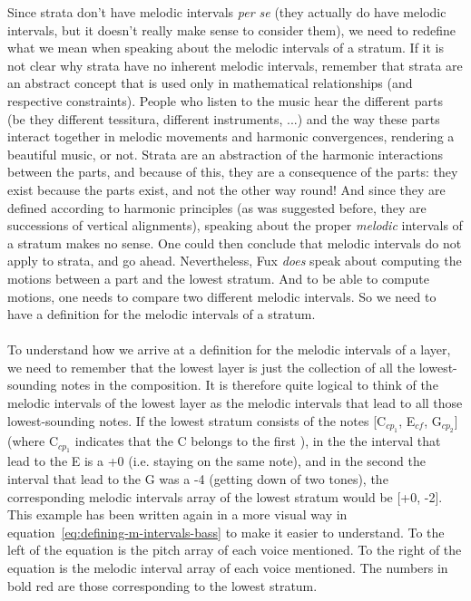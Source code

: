 Since strata don't have melodic intervals \textit{per se} (they actually do have melodic intervals, but it doesn't really make sense to consider them), we need to redefine what we mean when speaking about the melodic intervals of a stratum. If it is not clear why strata have no inherent melodic intervals, remember that strata are an abstract concept that is used only in mathematical relationships (and respective constraints). People who listen to the music hear the different parts (be they different tessitura, different instruments, ...) and the way these parts interact together in melodic movements and harmonic convergences, rendering a beautiful music, or not. Strata are an abstraction of the harmonic interactions between the parts, and because of this, they are a consequence of the parts: they exist because the parts exist, and not the other way round! And since they are defined according to harmonic principles (as was suggested before, they are successions of vertical alignments), speaking about the proper \textit{melodic} intervals of a stratum makes no sense. One could then conclude that melodic intervals do not apply to strata, and go ahead. Nevertheless, Fux \textit{does} speak about computing the motions between a part and the lowest stratum. And to be able to compute motions, one needs to compare two different melodic intervals. So we need to have a definition for the melodic intervals of a stratum. 

\paragraph{}
To understand how we arrive at a definition for the melodic intervals of a layer, we need to remember that the lowest layer is just the collection of all the lowest-sounding notes in the composition. It is therefore quite logical to think of the melodic intervals of the lowest layer as the melodic intervals that lead to all those lowest-sounding notes. If the lowest stratum consists of the notes [C$_{cp_1}$, E$_{\mathit{cf}}$, G$_{cp_2}$] (where C$_{cp_1}$ indicates that the C belongs to the first \cp), in the \cfs the interval that lead to the E is a +0 (i.e. staying on the same note), and in the second \cps the interval that lead to the G was a -4 (getting down of two tones), the corresponding melodic intervals array of the lowest stratum would be [+0, -2]. This example has been written again in a more visual way in equation~\ref{eq:defining-m-intervals-bass} to make it easier to understand. To the left of the equation is the pitch array of each voice mentioned. To the right of the equation is the melodic interval array of each voice mentioned. The numbers in bold red are those corresponding to the lowest stratum.


